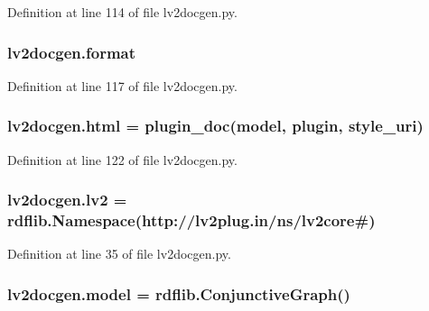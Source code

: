 Definition at line 114 of file lv2docgen.\+py.

\subsubsection[{\texorpdfstring{format}{format}}]{\setlength{\rightskip}{0pt plus 5cm}lv2docgen.\+format}\hypertarget{namespacelv2docgen_a2b91455cd6425494b5dd21b4662ae441}{}\label{namespacelv2docgen_a2b91455cd6425494b5dd21b4662ae441}


Definition at line 117 of file lv2docgen.\+py.

\subsubsection[{\texorpdfstring{html}{html}}]{\setlength{\rightskip}{0pt plus 5cm}lv2docgen.\+html = {\bf plugin\+\_\+doc}({\bf model}, {\bf plugin}, {\bf style\+\_\+uri})}\hypertarget{namespacelv2docgen_aa004997a70dee0a0506ce9497cdee44b}{}\label{namespacelv2docgen_aa004997a70dee0a0506ce9497cdee44b}


Definition at line 122 of file lv2docgen.\+py.

\subsubsection[{\texorpdfstring{lv2}{lv2}}]{\setlength{\rightskip}{0pt plus 5cm}lv2docgen.\+lv2 = rdflib.\+Namespace(\textquotesingle{}http\+://{\bf lv2plug.\+in}/{\bf ns}/lv2core\#\textquotesingle{})}\hypertarget{namespacelv2docgen_a9009471fe4bb1cea6073a223e6418b5a}{}\label{namespacelv2docgen_a9009471fe4bb1cea6073a223e6418b5a}


Definition at line 35 of file lv2docgen.\+py.

\subsubsection[{\texorpdfstring{model}{model}}]{\setlength{\rightskip}{0pt plus 5cm}lv2docgen.\+model = rdflib.\+Conjunctive\+Graph()}\hypertarget{namespacelv2docgen_ae1e22ed57f3a6f2ae8a8135e1bd15b37}{}\label{namespacelv2docgen_ae1e22ed57f3a6f2ae8a8135e1bd15b37}


